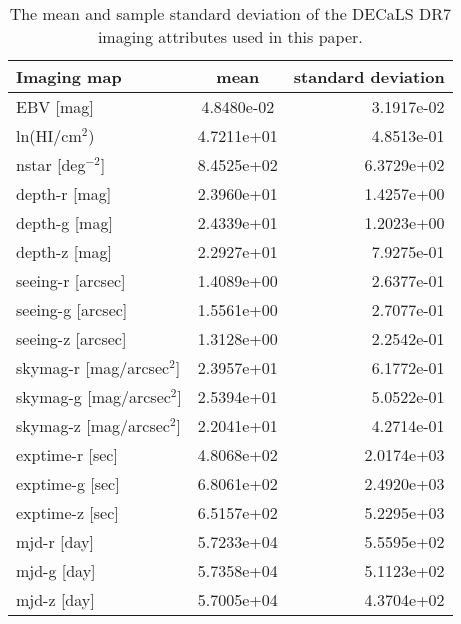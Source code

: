 \documentclass[fleqn, usenatbib]{mnras}
\begin{document}
\begin{table}
	\centering
	\caption{The mean and sample standard deviation of the DECaLS DR7 imaging attributes used in this paper.}
	\label{tab:meanstats}
	\begin{tabular}{lcr} %
	    \hline
		\hline
		Imaging map & mean & standard deviation \\
		\hline
         EBV [mag] & 4.8480e-02 & 3.1917e-02 \\ 
        ln(HI/cm$^{2}$) & 4.7211e+01 & 4.8513e-01 \\ 
        nstar [deg$^{-2}$] & 8.4525e+02 & 6.3729e+02 \\ 
        \hline
        depth-r [mag] & 2.3960e+01 & 1.4257e+00 \\ 
        depth-g [mag] & 2.4339e+01 & 1.2023e+00 \\ 
        depth-z [mag] & 2.2927e+01 & 7.9275e-01 \\ 
        \hline
        seeing-r [arcsec] & 1.4089e+00 & 2.6377e-01 \\ 
        seeing-g [arcsec]& 1.5561e+00 & 2.7077e-01 \\ 
        seeing-z [arcsec]& 1.3128e+00 & 2.2542e-01 \\ 
        \hline
        skymag-r [mag/arcsec$^{2}$] & 2.3957e+01 & 6.1772e-01 \\ 
        skymag-g [mag/arcsec$^{2}$] & 2.5394e+01 & 5.0522e-01 \\ 
        skymag-z [mag/arcsec$^{2}$]& 2.2041e+01 & 4.2714e-01 \\ 
        \hline
        exptime-r [sec] & 4.8068e+02 & 2.0174e+03 \\ 
        exptime-g [sec]& 6.8061e+02 & 2.4920e+03 \\ 
        exptime-z [sec]& 6.5157e+02 & 5.2295e+03 \\
        \hline
        mjd-r [day] & 5.7233e+04 & 5.5595e+02 \\ 
        mjd-g [day] & 5.7358e+04 & 5.1123e+02 \\ 
        mjd-z [day] & 5.7005e+04 & 4.3704e+02 \\ 
		\hline
		\hline
	\end{tabular}
\end{table}
 
\end{document}

